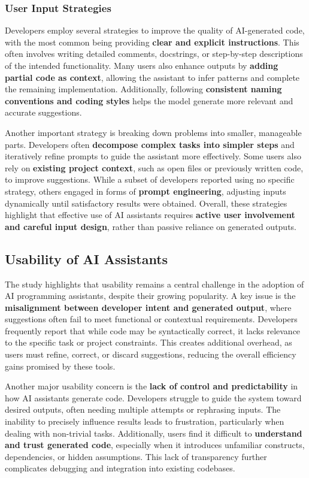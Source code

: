 \subsubsection{User Input Strategies}
Developers employ several strategies to improve the quality of AI-generated code, with the most common being providing \textbf{clear and explicit instructions}. This often involves writing detailed comments, docstrings, or step-by-step descriptions of the intended functionality. Many users also enhance outputs by \textbf{adding partial code as context}, allowing the assistant to infer patterns and complete the remaining implementation. Additionally, following \textbf{consistent naming conventions and coding styles} helps the model generate more relevant and accurate suggestions.

Another important strategy is breaking down problems into smaller, manageable parts. Developers often \textbf{decompose complex tasks into simpler steps} and iteratively refine prompts to guide the assistant more effectively. Some users also rely on \textbf{existing project context}, such as open files or previously written code, to improve suggestions. While a subset of developers reported using no specific strategy, others engaged in forms of \textbf{prompt engineering}, adjusting inputs dynamically until satisfactory results were obtained. Overall, these strategies highlight that effective use of AI assistants requires \textbf{active user involvement and careful input design}, rather than passive reliance on generated outputs.

\subsection{Usability of AI Assistants}
The study highlights that usability remains a central challenge in the adoption of AI programming assistants, despite their growing popularity. A key issue is the \textbf{misalignment between developer intent and generated output}, where suggestions often fail to meet functional or contextual requirements. Developers frequently report that while code may be syntactically correct, it lacks relevance to the specific task or project constraints. This creates additional overhead, as users must refine, correct, or discard suggestions, reducing the overall efficiency gains promised by these tools.

Another major usability concern is the \textbf{lack of control and predictability} in how AI assistants generate code. Developers struggle to guide the system toward desired outputs, often needing multiple attempts or rephrasing inputs. The inability to precisely influence results leads to frustration, particularly when dealing with non-trivial tasks. Additionally, users find it difficult to \textbf{understand and trust generated code}, especially when it introduces unfamiliar constructs, dependencies, or hidden assumptions. This lack of transparency further complicates debugging and integration into existing codebases.

